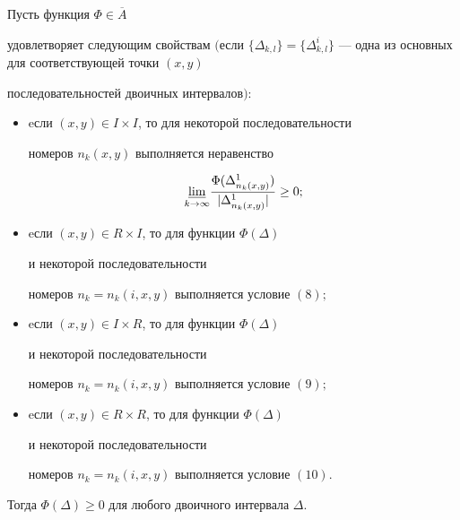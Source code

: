 \begin{thm}


Пусть функция $\Phi \in \overline{A}$ 


удовлетворяет следующим свойствам $($если $\{\Delta_{k,l}\}=


\{\Delta_{k,l}^{i}\}$ --- одна из основных для соответствующей точки $(x,y)$ 


последовательностей двоичных интервалов$){:}$


\begin{itemize}


\item[1.] eсли $(x,y)\in I\times I$, то для некоторой последовательности


номеров $n_{k}(x,y)$ выполняется неравенство 


$$


\underset{k \to \infty}{\varliminf}{}


\frac{\Phi (\Delta _{n_k(x,y)}^1)}


{| \Delta_{n_k(x,y)}^1|}\ge 0;


$$


\item[2.] eсли $(x,y)\in R\times I$, то для функции $\Phi (\Delta)$ 


и некоторой последовательности


номеров $n_k=n_{k}(i,x,y)$ выполняется условие $(8);$


\item[3.] eсли $(x,y)\in I\times R$, то для функции $\Phi (\Delta)$ 


и некоторой последовательности


номеров $n_k=n_{k}(i,x,y)$ выполняется условие $(9);$


\item[4.] eсли $(x,y)\in R\times R$, то для функции $\Phi (\Delta)$ 


и некоторой последовательности


номеров $n_k=n_{k}(i,x,y)$ выполняется условие $(10)$.


\end{itemize}





Тогда $\Phi (\Delta)\ge 0$ для любого двоичного интервала $\Delta $.


\end{thm}





